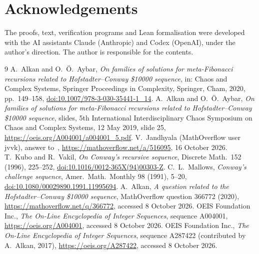 \documentclass[11pt]{amsart}
\theoremstyle{definition}
\theoremstyle{remark}
\numberwithin{equation}{section}
\begin{document}
\section*{Acknowledgements}
The proofs, text, verification programs and Lean formalisation were developed with the AI assistants Claude (Anthropic) and Codex (OpenAI), under the author's direction. The author is responsible for the contents.

\begin{thebibliography}{9}
 A.~Alkan and O.~\"O.~Aybar, \emph{On families of solutions for meta-Fibonacci recursions related to Hofstadter--Conway \$10000 sequence}, in: Chaos and Complex Systems, Springer Proceedings in Complexity, Springer, Cham, 2020, pp.~149--158, \href{https://doi.org/10.1007/978-3-030-35441-1_14}{doi:10.1007/978-3-030-35441-1\_14}.
 A.~Alkan and O.~\"O.~Aybar, \emph{On families of solutions for meta-Fibonacci recursions related to Hofstadter--Conway \$10000 sequence}, slides, 5th International Interdisciplinary Chaos Symposium on Chaos and Complex Systems, 12 May 2019, slide 25, \url{https://oeis.org/A004001/a004001_5.pdf}.
 V.~Jandhyala (MathOverflow user jvvk), answer to~\cite{MO}, \url{https://mathoverflow.net/a/516095}, 16 October 2026.
 T.~Kubo and R.~Vakil, \emph{On Conway's recursive sequence}, Discrete Math.\ 152 (1996), 225--252, \href{https://doi.org/10.1016/0012-365X(94)00303-Z}{doi:10.1016/0012-365X(94)00303-Z}.
 C.~L.~Mallows, \emph{Conway's challenge sequence}, Amer.\ Math.\ Monthly 98 (1991), 5--20, \href{https://doi.org/10.1080/00029890.1991.11995694}{doi:10.1080/00029890.1991.11995694}.
 A.~Alkan, \emph{A question related to the Hofstadter--Conway \$10000 sequence}, MathOverflow question 366772 (2020), \url{https://mathoverflow.net/q/366772}, accessed 8 October 2026.
 OEIS Foundation Inc., \emph{The On-Line Encyclopedia of Integer Sequences}, sequence A004001, \url{https://oeis.org/A004001}, accessed 8 October 2026.
 OEIS Foundation Inc., \emph{The On-Line Encyclopedia of Integer Sequences}, sequence A287422 (contributed by A.~Alkan, 2017), \url{https://oeis.org/A287422}, accessed 8 October 2026.
\end{thebibliography}
\end{document}
